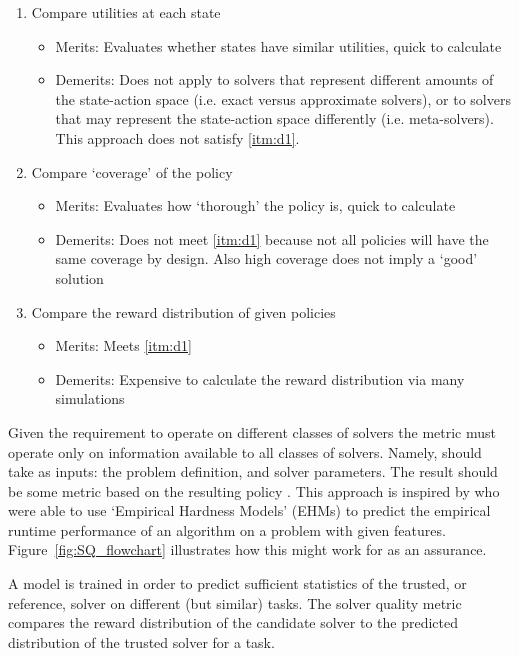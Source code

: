     \begin{enumerate}
        \item Compare utilities at each state \label{itm:i1}
        \begin{itemize}
            \item Merits: Evaluates whether states have similar utilities, quick to calculate
            \item Demerits: Does not apply to solvers that represent different amounts of the state-action space (i.e. exact versus approximate solvers), or to solvers that may represent the state-action space differently (i.e. meta-solvers). This approach does not satisfy \ref{itm:d1}.
        \end{itemize} 
        \item Compare `coverage' of the policy \label{itm:i2}
        \begin{itemize}
            \item Merits: Evaluates how `thorough' the policy is, quick to calculate
            \item Demerits: Does not meet \ref{itm:d1} because not all policies will have the same coverage by design. Also high coverage does not imply a `good' solution
        \end{itemize}
        \item Compare the reward distribution of given policies \label{itm:i3}
        \begin{itemize}
            \item Merits: Meets \ref{itm:d1}
            \item Demerits: Expensive to calculate the reward distribution via many simulations
        \end{itemize}
    \end{enumerate}
    
    Given the requirement to operate on different classes of solvers the \xQ{} metric must operate only on information available to all classes of solvers. Namely, \xQ{} should take as inputs: the problem definition, and solver parameters. The result should be some metric based on the resulting policy \policy. This approach is inspired by \cite{Leyton-Brown2009-yr} who were able to use `Empirical Hardness Models' (EHMs) to predict the empirical runtime performance of an algorithm on a problem with given features. Figure~\ref{fig:SQ_flowchart} illustrates how this might work for \xQ{} as an assurance.

    A model is trained in order to predict sufficient statistics of the trusted, or reference, solver \solvestar{} on different (but similar) tasks. The solver quality metric compares the reward distribution of the candidate solver to the predicted distribution of the trusted solver for a task.

